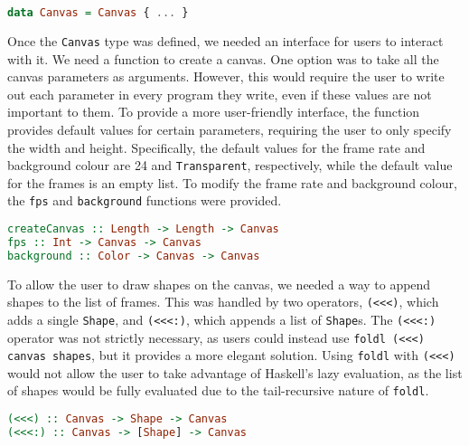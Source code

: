 \documentclass[../main.tex]{subfiles}
\begin{document}
        \begin{lstlisting}[language={Haskell}, label={lst:canvas}, caption={The \texttt{Canvas} type 
            definition.}]
data Canvas = Canvas { ... }\end{lstlisting}

        Once the \texttt{Canvas} type was defined, we needed an interface for users to
            interact with it.
        We need a function to create a canvas.
        One option was to take all the canvas parameters as arguments.
        However, this would require the user to write out each parameter in every
            program they write, even if these values are not important to them.
        To provide a more user-friendly interface, the function provides default values
            for certain parameters, requiring the user to only specify the width and
            height.
        Specifically, the default values for the frame rate and background colour are
            24 and \texttt{Transparent}, respectively, while the default value for the
            frames is an empty list.
        To modify the frame rate and background colour, the \texttt{fps} and
            \texttt{background} functions were provided.

        \begin{lstlisting}[language={Haskell}, label={lst:fps}, caption={The \texttt{createCanvas}, \texttt{fps} and 
            \texttt{backgrounds} functions.}]
createCanvas :: Length -> Length -> Canvas
fps :: Int -> Canvas -> Canvas
background :: Color -> Canvas -> Canvas\end{lstlisting}

        To allow the user to draw shapes on the canvas, we needed a way to append
            shapes to the list of frames.
        This was handled by two operators, \texttt{(<<<)}, which adds a single
            \texttt{Shape}, and \texttt{(<<<:)}, which appends a list of \texttt{Shape}s.
        The \texttt{(<<<:)} operator was not strictly necessary, as users could instead
            use \texttt{foldl (<<<) canvas shapes}, but it provides a more elegant
            solution.
        Using \texttt{foldl} with \texttt{(<<<)} would not allow the user to take
            advantage of Haskell's lazy evaluation, as the list of shapes would be fully
            evaluated due to the tail-recursive nature of \texttt{foldl}.

        \begin{lstlisting}[language={Haskell}, label={lst:<<<}, caption={The operators to append a 
            frame to the canvas.}]
(<<<) :: Canvas -> Shape -> Canvas
(<<<:) :: Canvas -> [Shape] -> Canvas\end{lstlisting}
\end{document}

